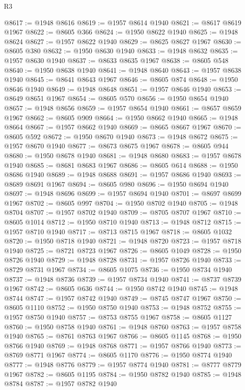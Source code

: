 \begin{lexlean}{R3}
\begin{coremodule}
@8617 := @1948 @8616
@8619 := @1957 @8614 @1940
@8621 := @8617 @8619 @1967
@8622 := @8605 @366
@8624 := @1950 @8622 @1940
@8625 := @1948 @8624
@8627 := @1957 @8622 @1940
@8629 := @8625 @8627 @1967
@8630 := @8605 @380
@8632 := @1950 @8630 @1940
@8633 := @1948 @8632
@8635 := @1957 @8630 @1940
@8637 := @8633 @8635 @1967
@8638 := @8605 @548
@8640 := @1950 @8638 @1940
@8641 := @1948 @8640
@8643 := @1957 @8638 @1940
@8645 := @8641 @8643 @1967
@8646 := @8605 @874
@8648 := @1950 @8646 @1940
@8649 := @1948 @8648
@8651 := @1957 @8646 @1940
@8653 := @8649 @8651 @1967
@8654 := @8605 @570
@8656 := @1950 @8654 @1940
@8657 := @1948 @8656
@8659 := @1957 @8654 @1940
@8661 := @8657 @8659 @1967
@8662 := @8605 @909
@8664 := @1950 @8662 @1940
@8665 := @1948 @8664
@8667 := @1957 @8662 @1940
@8669 := @8665 @8667 @1967
@8670 := @8605 @592
@8672 := @1950 @8670 @1940
@8673 := @1948 @8672
@8675 := @1957 @8670 @1940
@8677 := @8673 @8675 @1967
@8678 := @8605 @944
@8680 := @1950 @8678 @1940
@8681 := @1948 @8680
@8683 := @1957 @8678 @1940
@8685 := @8681 @8683 @1967
@8686 := @8605 @614
@8688 := @1950 @8686 @1940
@8689 := @1948 @8688
@8691 := @1957 @8686 @1940
@8693 := @8689 @8691 @1967
@8694 := @8605 @980
@8696 := @1950 @8694 @1940
@8697 := @1948 @8696
@8699 := @1957 @8694 @1940
@8701 := @8697 @8699 @1967
@8702 := @8605 @997
@8704 := @1950 @8702 @1940
@8705 := @1948 @8704
@8707 := @1957 @8702 @1940
@8709 := @8705 @8707 @1967
@8710 := @8605 @1014
@8712 := @1950 @8710 @1940
@8713 := @1948 @8712
@8715 := @1957 @8710 @1940
@8717 := @8713 @8715 @1967
@8718 := @8605 @1032
@8720 := @1950 @8718 @1940
@8721 := @1948 @8720
@8723 := @1957 @8718 @1940
@8725 := @8721 @8723 @1967
@8726 := @8605 @1049
@8728 := @1950 @8726 @1940
@8729 := @1948 @8728
@8731 := @1957 @8726 @1940
@8733 := @8729 @8731 @1967
@8734 := @8605 @1075
@8736 := @1950 @8734 @1940
@8737 := @1948 @8736
@8739 := @1957 @8734 @1940
@8741 := @8737 @8739 @1967
@8742 := @8605 @636
@8744 := @1950 @8742 @1940
@8745 := @1948 @8744
@8747 := @1957 @8742 @1940
@8749 := @8745 @8747 @1967
@8750 := @8605 @1110
@8752 := @1950 @8750 @1940
@8753 := @1948 @8752
@8755 := @1957 @8750 @1940
@8757 := @8753 @8755 @1967
@8758 := @8605 @1127
@8760 := @1950 @8758 @1940
@8761 := @1948 @8760
@8763 := @1957 @8758 @1940
@8765 := @8761 @8763 @1967
@8766 := @8605 @1145
@8768 := @1950 @8766 @1940
@8769 := @1948 @8768
@8771 := @1957 @8766 @1940
@8773 := @8769 @8771 @1967
@8774 := @8605 @1170
@8776 := @1950 @8774 @1940
@8777 := @1948 @8776
@8779 := @1957 @8774 @1940
@8781 := @8777 @8779 @1967
@8782 := @8605 @1195
@8784 := @1950 @8782 @1940
@8785 := @1948 @8784
@8787 := @1957 @8782 @1940

\end{coremodule}
\end{lexlean}
